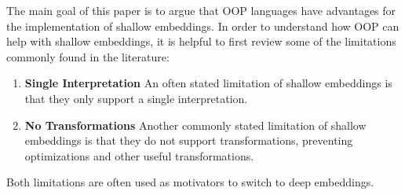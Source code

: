 \begin{comment}
If we accept Cook's view on OOP, 
a natural way to distinguish implementations of EDSLs is 
in terms of the data abstraction used to model the language
constructs instead. As Reynold's~\cite{reynolds94proceduralabstraction} suggested there are two
types of data abstraction: procedural abstraction and \emph{user-defined
  types}. It is clear that shallow embeddings use \emph{procedural
  abstraction}: the DSLs are modelled by interpretation
functions. Thus, the other implementation option for EDSLs is to
use \emph{user-defined types}. In Reynolds terminology user-defined
types mean disjoint union types, which are nowadays commonly available
in modern languages as \emph{algebraic datatypes}. Disjoint union
types can also be emulated in OOP using the {\sc Visitor} pattern. 

A distinction based on data abstraction is more precise and provides a
remedy for possible misinterpretation. An EDSL implemented with
algebraic datatypes falls into the category of user-defined types
(deep embedding), while a {\sc Composite}-based OO implementation falls
under procedural abstraction (shallow embedding). 
\end{comment}


The main goal of this paper is to argue that OOP languages have
advantages for the implementation of shallow embeddings. 
In order to understand how OOP can help with shallow embeddings, it is
helpful to
first review some of the limitations commonly
found in the literature:
\begin{enumerate}

\item {\bf Single Interpretation} An often stated limitation of
  shallow embeddings is that they only support a single
  interpretation.

\item {\bf No Transformations} Another commonly stated limitation 
of shallow embeddings is that they do not support transformations,
preventing optimizations and other useful transformations.

\end{enumerate}

\noindent Both limitations are often used as motivators to switch to deep embeddings.

